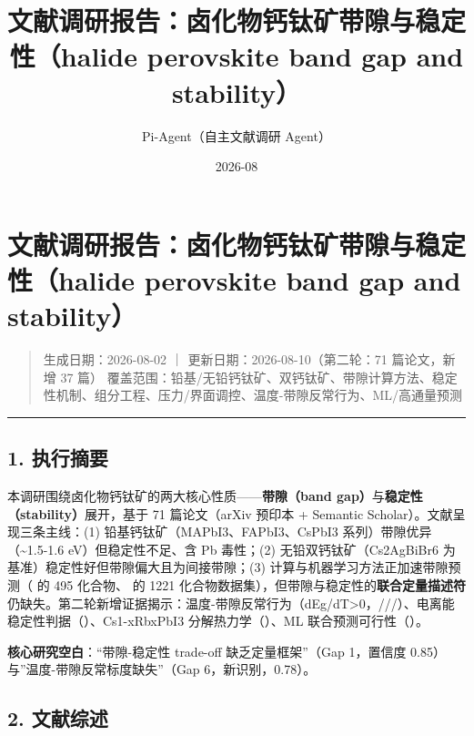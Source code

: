 \documentclass[12pt,a4paper]{ctexart}
\title{ 文献调研报告：卤化物钙钛矿带隙与稳定性（halide perovskite band gap and stability） }
\date{ 2026-08 }
\author{Pi-Agent（自主文献调研 Agent）}
\begin{document}
\maketitle
\sloppy  %

\section{文献调研报告：卤化物钙钛矿带隙与稳定性（halide perovskite band gap and stability）}\label{ux6587ux732eux8c03ux7814ux62a5ux544aux5364ux5316ux7269ux9499ux949bux77ffux5e26ux9699ux4e0eux7a33ux5b9aux6027halide-perovskite-band-gap-and-stability}

\begin{quote}
生成日期：2026-08-02 ｜ 更新日期：2026-08-10（第二轮：71 篇论文，新增 37 篇） 覆盖范围：铅基/无铅钙钛矿、双钙钛矿、带隙计算方法、稳定性机制、组分工程、压力/界面调控、温度-带隙反常行为、ML/高通量预测
\end{quote}

\begin{center}\rule{0.5\linewidth}{0.5pt}\end{center}

\subsection{1. 执行摘要}\label{ux6267ux884cux6458ux8981}

本调研围绕卤化物钙钛矿的两大核心性质------\textbf{带隙（band gap）}与\textbf{稳定性（stability）}展开，基于 71 篇论文（arXiv 预印本 + Semantic Scholar）。文献呈现三条主线：(1) 铅基钙钛矿（MAPbI3、FAPbI3、CsPbI3 系列）带隙优异（\textasciitilde1.5-1.6 eV）但稳定性不足、含 Pb 毒性；(2) 无铅双钙钛矿（Cs2AgBiBr6 为基准）稳定性好但带隙偏大且为间接带隙；(3) 计算与机器学习方法正加速带隙预测（\cite{p53} 的 495 化合物、\cite{p65} 的 1221 化合物数据集），但带隙与稳定性的\textbf{联合定量描述符}仍缺失。第二轮新增证据揭示：温度-带隙反常行为（dEg/dT\textgreater0，\cite{p36}/\cite{p38}/\cite{p39}/\cite{p49}）、电离能稳定性判据（\cite{p50}）、Cs1-xRbxPbI3 分解热力学（\cite{p57}）、ML 联合预测可行性（\cite{p60}）。

\textbf{核心研究空白}：``带隙-稳定性 trade-off 缺乏定量框架''（Gap 1，置信度 0.85）与''温度-带隙反常标度缺失''（Gap 6，新识别，0.78）。

\subsection{2. 文献综述}\label{ux6587ux732eux7efcux8ff0}
\end{document}
